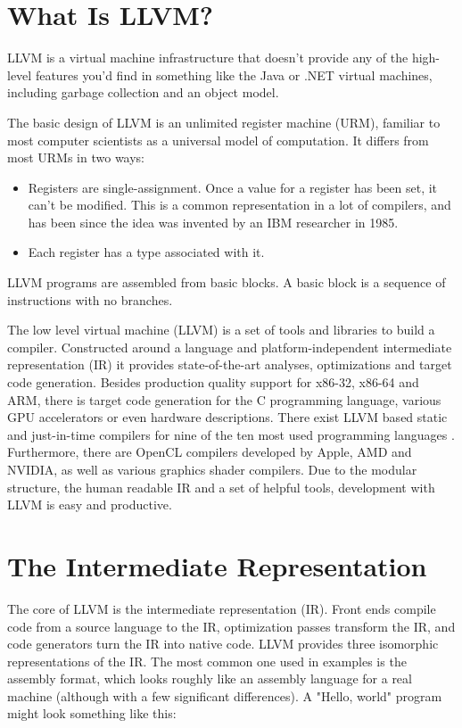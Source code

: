 \label{chap:llvm}
\section{What Is LLVM?}
LLVM is a virtual machine infrastructure that doesn’t provide any of the high-level features you’d find in something like the Java or .NET virtual machines, including garbage collection and an object model.

The basic design of LLVM is an unlimited register machine (URM), familiar to most computer scientists as a universal model of computation. It differs from most URMs in two ways:

\begin{itemize}
\item Registers are single-assignment. Once a value for a register has been set, it can’t be modified. This is a common representation in a lot of compilers, and has been since the idea was invented by an IBM researcher in 1985.
\item Each register has a type associated with it.
\end{itemize}

LLVM programs are assembled from basic blocks. A basic block is a sequence of instructions with no branches.

The low level virtual machine (LLVM) \cite{10.1109/CGO.2004.1281665} is a set
of tools and libraries to build a compiler. Constructed around a language and
platform-independent intermediate representation (IR) it provides
state-of-the-art analyses, optimizations and target code generation. Besides production
quality support for x86-32, x86-64 and ARM, there is target code generation for
the C programming language, various GPU accelerators or even hardware
descriptions.  There exist LLVM based static and just-in-time
compilers for nine of the ten most used programming languages \cite{tiobe11}.
Furthermore, there are OpenCL compilers developed by Apple, AMD and NVIDIA, as
well as various graphics shader compilers. Due to the modular structure, the
human readable IR and a set of helpful tools, development with LLVM is easy and
productive.

\section{The Intermediate Representation}

The core of LLVM is the intermediate representation (IR). Front ends compile code from a source language to the IR, optimization passes transform the IR, and code generators turn the IR into native code.
LLVM provides three isomorphic representations of the IR. The most common one used in examples is the assembly format, which looks roughly like an assembly language for a real machine (although with a few significant differences). A "Hello, world" program might look something like this:

